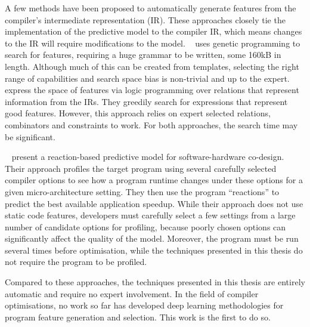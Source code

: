 A few methods have been proposed to automatically generate features from the compiler's intermediate representation (IR). These approaches closely tie the implementation of the predictive model to the compiler IR, which means changes to the IR will require modifications to the model.
\citeauthor{Leather2014}~\cite{Leather2014} uses genetic programming to search for features, requiring a huge grammar to be written, some 160kB in length. Although much of this can be created from templates, selecting the right range of capabilities and search space bias is non-trivial and up to the expert.
\citeauthor{Namolaru2010a}~\cite{Namolaru2010a} express the space of features via logic programming over relations that represent information from the IRs. They greedily search for expressions that represent good features. However, this approach relies on expert selected relations, combinators and constraints to work. For both approaches, the search time may be significant.

\citeauthor{Cavazos2006}~\cite{Cavazos2006} present a reaction-based predictive model for software-hardware co-design. Their approach profiles the target program using several carefully selected compiler options to see how a program runtime changes under these options for a given micro-architecture setting. They then use the program ``reactions'' to predict the best available application speedup. While their approach does not use static code features, developers must carefully select a few settings from a large number of candidate options for profiling, because poorly chosen options can significantly affect the quality of the model. Moreover, the program must be run several times before optimisation, while the techniques presented in this thesis do not require the program to be profiled.

Compared to these approaches, the techniques presented in this thesis are entirely automatic and require no expert involvement. In the field of compiler optimisations, no work so far has developed deep learning methodologies for program feature generation and selection. This work is the first to do so.


